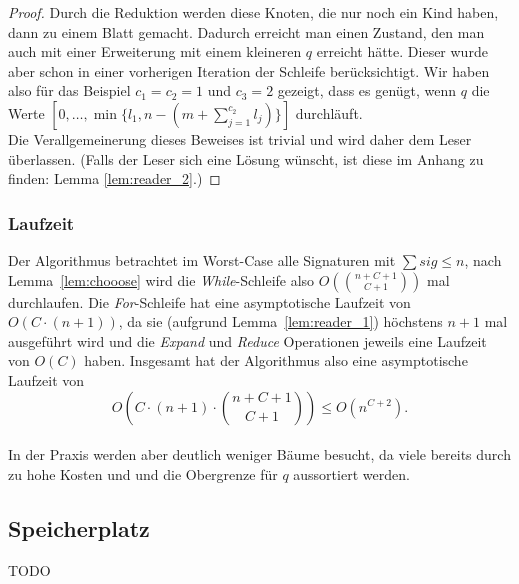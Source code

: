 \documentclass[a4paper,10pt,ngerman]{scrartcl}
\begin{document}
\begin{proof}
        Durch die Reduktion werden diese Knoten, die nur noch ein Kind haben, dann zu einem Blatt gemacht.
        Dadurch erreicht man einen Zustand, den man auch mit einer Erweiterung mit einem kleineren $q$ erreicht hätte.
        Dieser wurde aber schon in einer vorherigen Iteration der Schleife berücksichtigt.
        Wir haben also für das Beispiel $c_1 = c_2 = 1$ und $c_3 = 2$ gezeigt, dass es genügt, wenn $q$ die Werte $[0, \dots, \min\{l_1, n - (m + \sum^{c_2}_{j=1} l_j)\}]$ durchläuft.\\
        Die Verallgemeinerung dieses Beweises ist trivial und wird daher dem Leser überlassen.
        (Falls der Leser sich eine Lösung wünscht, ist diese im Anhang zu finden: Lemma \ref{lem:reader_2}.)
    \end{proof}

    \subsubsection{Laufzeit}
    Der Algorithmus betrachtet im Worst-Case alle Signaturen mit $\sum sig \le n$, nach Lemma~\ref{lem:chooose} wird die \textit{While}-Schleife also $O({{n + C + 1}\choose{C + 1}})$ mal durchlaufen.
    Die \textit{For}-Schleife hat eine asymptotische Laufzeit von $O(C \cdot (n + 1))$, da sie (aufgrund Lemma~\ref{lem:reader_1}) höchstens $n + 1$ mal ausgeführt wird und die \textit{Expand} und \textit{Reduce} Operationen jeweils eine Laufzeit von $O(C)$ haben. Insgesamt hat der Algorithmus also eine asymptotische Laufzeit von \[O\left(C \cdot (n + 1) \cdot {{n + C + 1}\choose{C + 1}}\right) \le O(n^{C+2}).\] \\ %
    In der Praxis werden aber deutlich weniger Bäume besucht, da viele bereits durch zu hohe Kosten und und die Obergrenze für $q$ aussortiert werden.

    \subsection{Speicherplatz}
    TODO
\end{document}
